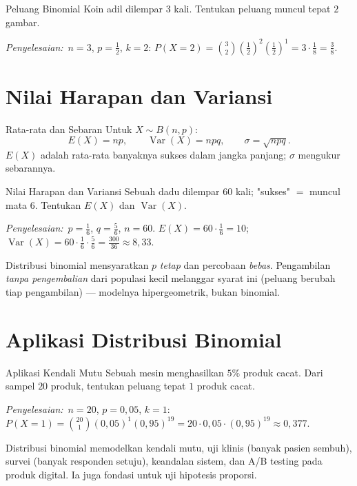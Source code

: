\documentclass[11pt,a4paper]{report}
\theoremstyle{gaya}
\newcommand{\jawab}{\par\smallskip\noindent\textit{\textcolor{oranye}{Penyelesaian:}}\ }
\begin{document}
\begin{contoh}{Peluang Binomial}
Koin adil dilempar $3$ kali. Tentukan peluang muncul tepat $2$ gambar.

\jawab $n=3$, $p=\tfrac12$, $k=2$: $P(X=2)=\binom32\left(\tfrac12\right)^2\left(\tfrac12\right)^1=3\cdot\tfrac18=\tfrac38$.
\end{contoh}

\section{Nilai Harapan dan Variansi}
\begin{konsep}{Rata-rata dan Sebaran}
Untuk $X\sim B(n,p)$:
\[
E(X)=np,\qquad \operatorname{Var}(X)=npq,\qquad \sigma=\sqrt{npq}.
\]
$E(X)$ adalah rata-rata banyaknya sukses dalam jangka panjang; $\sigma$ mengukur sebarannya.
\end{konsep}

\begin{contoh}{Nilai Harapan dan Variansi}
Sebuah dadu dilempar $60$ kali; "sukses" $=$ muncul mata $6$. Tentukan $E(X)$ dan $\operatorname{Var}(X)$.

\jawab $p=\tfrac16$, $q=\tfrac56$, $n=60$. $E(X)=60\cdot\tfrac16=10$; $\operatorname{Var}(X)=60\cdot\tfrac16\cdot\tfrac56=\tfrac{300}{36}\approx8{,}33$.
\end{contoh}

\begin{kesalahan}
Distribusi binomial mensyaratkan $p$ \emph{tetap} dan percobaan \emph{bebas}. Pengambilan \emph{tanpa pengembalian} dari populasi kecil melanggar syarat ini (peluang berubah tiap pengambilan) --- modelnya hipergeometrik, bukan binomial.
\end{kesalahan}

\section{Aplikasi Distribusi Binomial}
\begin{contoh}{Aplikasi Kendali Mutu}
Sebuah mesin menghasilkan $5\%$ produk cacat. Dari sampel $20$ produk, tentukan peluang tepat $1$ produk cacat.

\jawab $n=20$, $p=0{,}05$, $k=1$: $P(X=1)=\binom{20}{1}(0{,}05)^1(0{,}95)^{19}=20\cdot0{,}05\cdot(0{,}95)^{19}\approx0{,}377$.
\end{contoh}

\begin{dunianyata}
Distribusi binomial memodelkan kendali mutu, uji klinis (banyak pasien sembuh), survei (banyak responden setuju), keandalan sistem, dan A/B testing pada produk digital. Ia juga fondasi untuk uji hipotesis proporsi.
\end{dunianyata}
\end{document}
